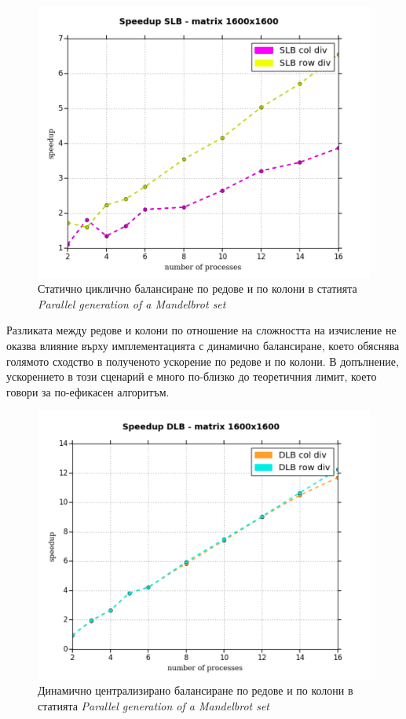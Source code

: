 \documentclass[a4paper,11pt]{article}
\begin{document}
\begin{enumerate}
    \begin{figure}[H]
        \centering
        \includegraphics[width=0.9\linewidth]{images/mirco2.png}
        \caption{Статично циклично балансиране по редове и по колони в статията \emph{Parallel generation of a Mandelbrot set}}
        \label{fig:mirco-2}
    \end{figure}    
    Разликата между редове и колони по отношение на сложността на изчисление не оказва влияние върху имплементацията с динамично балансиране, което обяснява голямото сходство в полученото ускорение по редове и по колони. В допълнение, ускорението в този сценарий е много по-близко до теоретичния лимит, което говори за по-ефикасен алгоритъм. 
    \begin{figure}[H]
        \centering
        \includegraphics[width=0.9\linewidth]{images/mirco3.png}
        \caption{Динамично централизирано балансиране по редове и по колони в статията \emph{Parallel generation of a Mandelbrot set}}
        \label{fig:mirco-3}
    \end{figure}
\end{enumerate}
\end{document}
